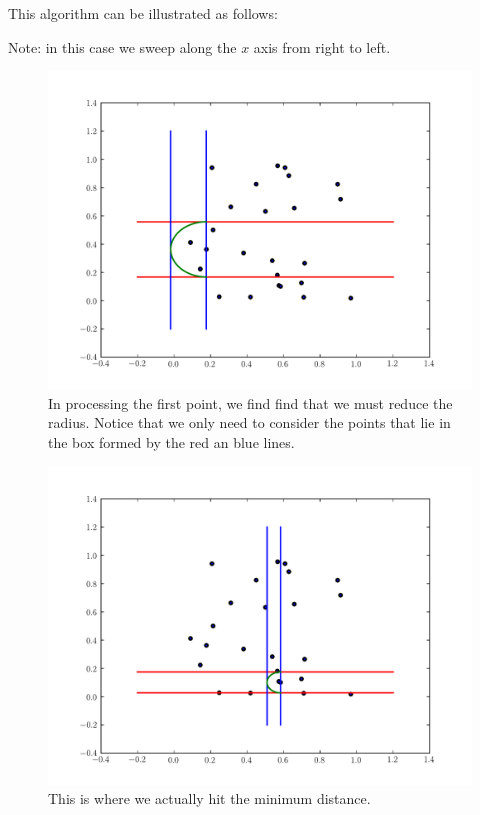 This algorithm can be illustrated as follows:

Note: in this case we sweep along the $x$ axis from right to left.

\begin{figure}[H]
\includegraphics[width = .8\textwidth]{sweep0.pdf}
\caption{In processing the first point, we find find that we must reduce the radius.
Notice that we only need to consider the points that lie in the box formed by the red an blue lines.}
\end{figure}

\begin{figure}[H]
\includegraphics[width = .8\textwidth]{sweep13.pdf}
\caption{This is where we actually hit the minimum distance.}
\end{figure}

